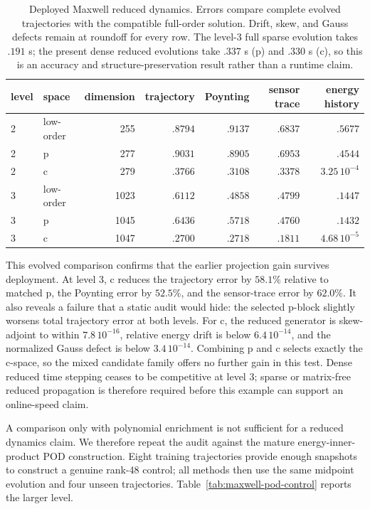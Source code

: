 \documentclass[11pt]{article}
\numberwithin{algorithm}{section}
\theoremstyle{definition}\newtheorem{definition}[theorem]{Definition}
\theoremstyle{remark}\newtheorem{remark}[theorem]{Remark}
\begin{document}
\begin{table}[H]
\centering
\caption{Deployed Maxwell reduced dynamics.  Errors compare complete evolved
trajectories with the compatible full-order solution.  Drift, skew, and Gauss
defects remain at roundoff for every row.  The level-3 full sparse evolution
takes $.191$ s; the present dense reduced evolutions take $.337$ s (p) and
$.330$ s (c), so this is an accuracy and structure-preservation result rather
than a runtime claim.}
\label{tab:maxwell-reduced-dynamics}
\begin{tabular}{llrrrrr}
\toprule
level & space & dimension & trajectory & Poynting & sensor trace & energy history\\
\midrule
2 & low-order & 255  & $.8794$ & $.9137$ & $.6837$ & $.5677$\\
2 & p         & 277  & $.9031$ & $.8905$ & $.6953$ & $.4544$\\
2 & c         & 279  & $.3766$ & $.3108$ & $.3378$ & $3.25\,10^{-4}$\\
3 & low-order & 1023 & $.6112$ & $.4858$ & $.4799$ & $.1447$\\
3 & p         & 1045 & $.6436$ & $.5718$ & $.4760$ & $.1432$\\
3 & c         & 1047 & $.2700$ & $.2718$ & $.1811$ & $4.68\,10^{-5}$\\
\bottomrule
\end{tabular}
\end{table}

This evolved comparison confirms that the earlier projection gain survives
deployment.  At level 3, c reduces the trajectory error by $58.1\%$ relative
to matched p, the Poynting error by $52.5\%$, and the sensor-trace error by
$62.0\%$.  It also reveals a failure that a static audit would hide: the
selected p-block slightly worsens total trajectory error at both levels.
For c, the reduced generator is skew-adjoint to within $7.8\,10^{-16}$,
relative energy drift is below $6.4\,10^{-14}$, and the normalized Gauss
defect is below $3.4\,10^{-14}$.  Combining p and c selects exactly the c-space,
so the mixed candidate family offers no further gain in this test.  Dense
reduced time stepping ceases to be competitive at level 3; sparse or
matrix-free reduced propagation is therefore required before this example
can support an online-speed claim.

A comparison only with polynomial enrichment is not sufficient for a reduced
dynamics claim.  We therefore repeat the audit against the mature
energy-inner-product POD construction.  Eight training trajectories provide
enough snapshots to construct a genuine rank-48 control; all methods then use
the same midpoint evolution and four unseen trajectories.  Table~\ref{tab:maxwell-pod-control}
reports the larger level.
\end{document}
